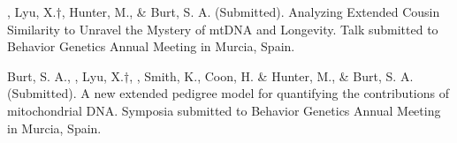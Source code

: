 
\item \meb, Lyu, X.$\dagger$, Hunter, M., \& Burt, S. A. (Submitted). Analyzing Extended Cousin Similarity to Unravel the Mystery of mtDNA and Longevity. Talk submitted to Behavior Genetics Annual Meeting in Murcia, Spain.

\item Burt, S. A., \meb, Lyu, X.$\dagger$, \Joe, Smith, K., Coon, H. \& Hunter, M., \& Burt, S. A. (Submitted). A new extended pedigree model for quantifying the contributions of mitochondrial DNA. Symposia submitted to Behavior Genetics Annual Meeting in Murcia, Spain.




%
%

%

%

%

%
